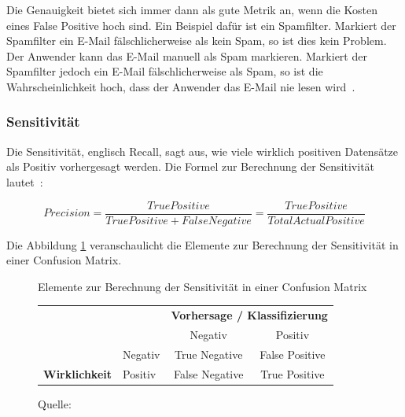 Die Genauigkeit bietet sich immer dann als gute Metrik an, wenn die Kosten eines False Positive hoch sind. Ein Beispiel dafür ist ein Spamfilter. Markiert der Spamfilter ein E-Mail fälschlicherweise als kein Spam, so ist dies kein Problem. Der Anwender kann das E-Mail manuell als Spam markieren. Markiert der Spamfilter jedoch ein E-Mail fälschlicherweise als Spam, so ist die Wahrscheinlichkeit hoch, dass der Anwender das E-Mail nie lesen wird~\autocite{TDSAccuracy}.

\subsubsection{Sensitivität}

Die Sensitivität, englisch Recall, sagt aus, wie viele wirklich positiven Datensätze als Positiv vorhergesagt werden. Die Formel zur Berechnung der Sensitivität lautet~\autocite{TDSAccuracy}: 

\nopagebreak

$$Precision = \frac{True Positive}{True Positive + False Negative} = \frac{True Positive}{Total Actual Positive}$$

Die Abbildung \ref{cm-recall} veranschaulicht die Elemente zur Berechnung der Sensitivität in einer Confusion Matrix.

\begin{figure}[h!]
    \centering
    \captionsetup{width=.9\linewidth}
    \caption{Elemente zur Berechnung der Sensitivität in einer Confusion Matrix}
    \def\arraystretch{1.5}
    \begin{tabular}{llcc}
        \multicolumn{2}{l}{}                                                                                                & \multicolumn{2}{c}{\textbf{Vorhersage / Klassifizierung}}                                                                \\ \cline{3-4} 
        \multicolumn{1}{c}{\textbf{}}                                & \multicolumn{1}{l|}{}                                & \multicolumn{1}{c|}{Negativ}                                & \multicolumn{1}{c|}{Positiv}                               \\ \cline{2-4} 
        \multicolumn{1}{l|}{}                                        & \multicolumn{1}{l|}{Negativ}                         & \multicolumn{1}{c|}{True Negative}                          & \multicolumn{1}{c|}{False Positive}                        \\ \cline{2-4} 
        \multicolumn{1}{l|}{\multirow{-2}{*}{\textbf{Wirklichkeit}}} & \multicolumn{1}{l|}{\cellcolor[HTML]{B5D0EE}Positiv} & \multicolumn{1}{c|}{\cellcolor[HTML]{B5D0EE}False Negative} & \multicolumn{1}{c|}{\cellcolor[HTML]{B5D0EE}True Positive} \\ \cline{2-4} 
    \end{tabular}
    \caption*{Quelle: \textcite{TDSAccuracy}}
    \label{cm-recall}
\end{figure}

